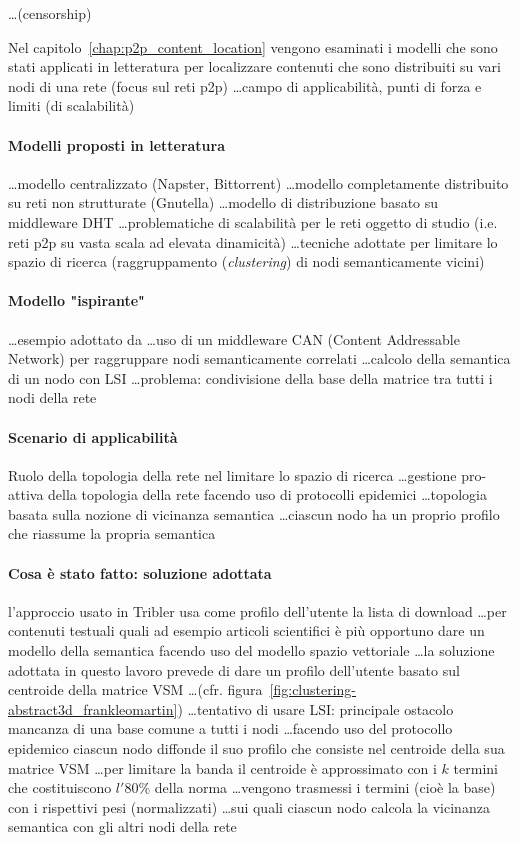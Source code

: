 \ldots (censorship)

Nel capitolo~\ref{chap:p2p_content_location} vengono esaminati i modelli che sono stati applicati in letteratura per localizzare contenuti che sono distribuiti su vari nodi di una rete (focus sul reti p2p) \ldots campo di applicabilità, punti di forza e limiti (di scalabilità)

\paragraph{Modelli proposti in letteratura}
\ldots modello centralizzato (Napster, Bittorrent) \ldots modello completamente distribuito su reti non strutturate (Gnutella) \ldots modello di distribuzione basato su middleware DHT \ldots problematiche di scalabilità per le reti oggetto di studio (i.e. reti p2p su vasta scala ad elevata dinamicità) \ldots tecniche adottate per limitare lo spazio di ricerca (raggruppamento (\textit{clustering}) di nodi semanticamente vicini)

\paragraph{Modello "ispirante"}\ldots esempio adottato da \cite{TXD03} \ldots uso di un middleware CAN (Content Addressable Network) per raggruppare nodi semanticamente correlati \ldots calcolo della semantica di un nodo con LSI \ldots problema: condivisione della base della matrice tra tutti i nodi della rete

\paragraph{Scenario di applicabilità}
Ruolo della topologia della rete nel limitare lo spazio di ricerca \ldots gestione pro-attiva della topologia della rete facendo uso di protocolli epidemici \ldots topologia basata sulla nozione di vicinanza semantica \ldots ciascun nodo ha un proprio profilo che riassume la propria semantica

\paragraph{Cosa è stato fatto: soluzione adottata}l'approccio usato in Tribler \cite{PGW+08} usa come profilo dell'utente la lista di download \ldots per contenuti testuali quali ad esempio articoli scientifici è più opportuno dare un modello della semantica facendo uso del modello spazio vettoriale \ldots la soluzione adottata in questo lavoro prevede di dare un profilo dell'utente basato sul centroide della matrice VSM \ldots (cfr. figura~\ref{fig:clustering-abstract3d_frankleomartin}) \ldots tentativo di usare LSI: principale ostacolo mancanza di una base comune a tutti i nodi \ldots facendo uso del protocollo epidemico ciascun nodo diffonde il suo profilo che consiste nel centroide della sua matrice VSM \ldots per limitare la banda il centroide è approssimato con i $k$ termini che costituiscono $l'80\%$ della norma \ldots vengono trasmessi i termini (cioè la base) con i rispettivi pesi (normalizzati) \ldots sui quali ciascun nodo calcola la vicinanza semantica con gli altri nodi della rete

